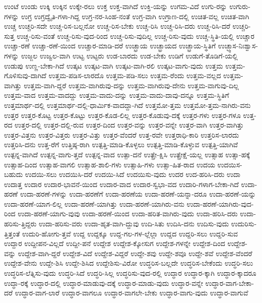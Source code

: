 {ಉಂಟೆ
ಉಂಡು
ಉಕ್ಕಿ
ಉಕ್ಕಿನ
ಉಕ್ಕೇ-ರಲು
ಉಕ್ತ
ಉಕ್ತ-ವಾಗಿದೆ
ಉಕ್ತಿ-ಯನ್ನು
ಉಗಮ-ವಿದೆ
ಉಗು-ರನ್ನು
ಉಗುರು-ಗಳನ್ನು
ಉಗ್ರ
ಉಗ್ರದ್ವೈತಿ-ಗಳಾ-ಗಿದ್ದ
ಉಗ್ರ-ನರ-ಸಿಂಹ-ನಂತೆ
ಉಗ್ರ-ವಾಗಿ
ಉಗ್ರಾಣ-ದಲ್ಲಿ
ಉಚಿತ-ವಲ್ಲ
ಉಚಿತ-ವಾಗಿ
ಉಚ್ಚ
ಉಚ್ಚರಿ-ಸದೇ
ಉಚ್ಚ-ರಿಸ-ಬಲ್ಲನೋ
ಉಚ್ಚ-ರಿಸ-ಬೇಕು
ಉಚ್ಚ-ರಿಸಿ
ಉಚ್ಚ-ರಿಸಿ-ದರು
ಉಚ್ಚ-ರಿಸಿ-ದರೆ
ಉಚ್ಚರಿ-ಸುತ್ತ
ಉಚ್ಚ-ರಿಸು-ವಂತೆ
ಉಚ್ಚ-ರಿಸು-ವುದ-ರಿಂದ
ಉಚ್ಚ-ರಿಸು-ವುದಿಲ್ಲ
ಉಚ್ಚ-ರಿಸು-ವುದು
ಉಚ್ಚ-ಸ್ಥಿತಿ-ಯಲ್ಲಿ
ಉಚ್ಚಾರ
ಉಚ್ಚಾ-ರಣೆ
ಉಚ್ಚಾ-ರಣೆ-ಯಿಂದ
ಉಚ್ಚಾರ-ಮಾಡಿ-ದರೆ
ಉಚ್ಛ್ರಾಯ
ಉಚ್ಛ್ರಾಯದ
ಉಚ್ಛ್ರಾಯ-ಸ್ಥಿತಿಗೆ
ಉಚ್ಛ್ವಾಸ-ನಿಃಶ್ವಾಸ-ಗಳನ್ನು
ಉಜ್ಜಲ
ಉಜ್ವಲ-ವಾಗಿ
ಉಟ್ಟ
ಉಟ್ಟರು
ಉಡ-ಬಾರದು
ಉಡ-ಬೇಕು
ಉಡಿಗೆ
ಉಡುಗೆ-ತೊಡಿಗೆ-ಯಲ್ಲಿ
ಉಡುಪು
ಉಣ್ಣ-ಬೇಕಾ-ಗಿದೆ
ಉತ್ಕಟ
ಉತ್ಕಟ-ವಾಗಿ
ಉತ್ಕಟ-ವಾಗಿ-ರಲಿ
ಉತ್ಕಟ-ವಾಗು-ವುದು
ಉತ್ತಮ
ಉತ್ತಮ-ಗೊಳಿಸುವು-ದಾಗಿದೆ
ಉತ್ತಮ-ಪಡಿಸ-ಲಾರದೊ
ಉತ್ತಮ-ಪಡಿ-ಸಲು
ಉತ್ತಮ-ರೆಂದು
ಉತ್ತಮ-ವಲ್ಲದ
ಉತ್ತಮ-ವಾಗಿತ್ತು
ಉತ್ತಮ-ವಾಗಿ-ದ್ದರೆ
ಉತ್ತಮ-ವಾಗಿರುವು-ದನ್ನು
ಉತ್ತಮ-ವಾಗಿರುವು-ದೇನು
ಉತ್ತಮ-ವಾಗುವು-ದಿಲ್ಲ
ಉತ್ತಮ-ವಾದ
ಉತ್ತಮ-ವಾದದ್ದು
ಉತ್ತಮ-ವಾದು-ದನ್ನು
ಉತ್ತಮ-ವಾದು-ದಾವು-ದನ್ನೂ
ಉತ್ತಮ-ಸ್ಥಿತಿಗೆ
ಉತ್ತಮಾರ್ಥ-ದಲ್ಲಿ
ಉತ್ತಮಾರ್ಥ-ದಲ್ಲಿ-ಧಾರ್ಮಿಕ-ವಾದದ್ದಾ-ಗಿದೆ
ಉತ್ತಮೋ-ತ್ತಮ
ಉತ್ತಮೋ-ತ್ತಮ-ನಾಗಿರು-ವನು
ಉತ್ತರ
ಉತ್ತರ-ಕೊಟ್ಟ
ಉತ್ತರ-ಕೊಟ್ಟು
ಉತ್ತರ-ಕೊಡ-ಲಿಲ್ಲ
ಉತ್ತರ-ಕೊಡುವು-ದಕ್ಕೆ
ಉತ್ತರ-ಗಳು
ಉತ್ತರ-ಗಳೂ
ಉತ್ತ-ರದ
ಉತ್ತರ-ದಲ್ಲಿ
ಉತ್ತರ-ದಲ್ಲಿ-ರುವ
ಉತ್ತರ-ದಿಂದ
ಉತ್ತರ-ವನ್ನು
ಉತ್ತರ-ವನ್ನೇ
ಉತ್ತರ-ವಾಗಿ
ಉತ್ತರ-ವಾಗಿತ್ತು
ಉತ್ತರ-ವಿತ್ತನು
ಉತ್ತರ-ವಿತ್ತರು
ಉತ್ತರ-ವಿತ್ತು
ಉತ್ತರ-ವೆಂದರೆ
ಉತ್ತ-ರವೇ
ಉತ್ತರಾಧಿ-ಕಾರಿ
ಉತ್ತರಿಸ-ಲಾರದು
ಉತ್ತರಿಸಿ-ದನು
ಉತ್ತ-ರೆಗೆ
ಉತ್ತಿಷ್ಠ-ರಾಗಿ
ಉತ್ಪತ್ತಿ-ಮಾಡಿ-ಕೊಳ್ಳಲು
ಉತ್ಪತ್ತಿ-ಮಾಡಿ-ಕೊಳ್ಳುವ
ಉತ್ಪತ್ತಿ-ಯಾಗಿವೆ
ಉತ್ಪನ್ನ-ವಾಗಿದೆ
ಉತ್ಪನ್ನ-ವಾಗು-ತ್ತದೆ
ಉತ್ಪನ್ನ-ವಾದ
ಉತ್ಪಾ-ದನೆ
ಉತ್ಪ್ರೇ-ಕ್ಷಿಸಿ
ಉತ್ಪ್ರೇಕ್ಷೆ-ಯಲ್ಲ
ಉತ್ಸಾಹ
ಉತ್ಸಾ-ಹಕ್ಕೆ
ಉತ್ಸಾಹ-ದಿಂದ
ಉತ್ಸಾಹ-ವಾಗಲಿ
ಉತ್ಸಾಹ-ಶಾಲಿ-ಗಳು
ಉತ್ಸಾಹಿ-ಗಳು
ಉತ್ಸಾ-ಹಿತ-ರಾದ
ಉದಯ
ಉದಯಿಸ-ಬಹುದು
ಉದಯಿ-ಸಲು
ಉದಯಿಸಿ-ದರೆ
ಉದಯಿ-ಸಿದೆ
ಉದಯಿಸು-ವುದು
ಉದರ
ಉದ-ಹರಿಸಿ-ದರು
ಉದಾ
ಉದಾತ್ತ
ಉದಾರ
ಉದಾರ-ಭಾವನೆ-ಯಿಂದ
ಉದಾರ-ವಾದ
ಉದಾರ-ಸ್ವಭಾ-ವದ
ಉದಾರಿ-ಗಳಾಗ-ಬೇಕಾ-ಗಿದೆ
ಉದಾ-ಹರಣೆ
ಉದಾ-ಹರಣೆ-ಗಳನ್ನು
ಉದಾ-ಹರಣೆಗೆ
ಉದಾ-ಹರಣೆಯ
ಉದಾ-ಹರಣೆ-ಯನ್ನಾ-ದರೂ
ಉದಾ-ಹರಣೆ-ಯನ್ನು
ಉದಾ-ಹರಣೆ-ಯಾಗ-ಲಿಲ್ಲ
ಉದಾ-ಹರಣೆ-ಯಾಗಿತ್ತು
ಉದಾ-ಹರಣೆ-ಯಾಗಿರು-ವನು
ಉದಾ-ಹರಣೆ-ಯಾಗಿರು-ವುದ-ರಿಂದ
ಉದಾ-ಹರಣೆ-ಯಾಗು-ವುವು
ಉದಾ-ಹರಣೆ-ಯಿಂದ
ಉದಾ-ಹರಿತ-ವಾಗಿರು-ವುದು
ಉದಾ-ಹರಿಸಿ-ದರು
ಉದಾ-ಹರಿಸು-ತ್ತಿದ್ದರು
ಉದಾ-ಹರಿಸು-ವರು
ಉದಾ-ಹೃತ-ವಾಗಿ-ದ್ದುವು
ಉದಿ-ಸಿತು
ಉದಿಸಿ-ದನು
ಉದಿಸು-ವುದು
ಉದುರಿಸು-ತ್ತಿತ್ತಂತೆ
ಉದುರಿ-ಹೋಗು-ತ್ತವೆ
ಉದ್ದ
ಉದ್ದಕ್ಕೂ
ಉದ್ದ-ಗಲ-ಗಳ-ಲ್ಲೆಲ್ಲಾ
ಉದ್ದದ
ಉದ್ದರಿ-ಸಲು
ಉದ್ದರಿ-ಸುವ
ಉದ್ದಾರ
ಉದ್ದೀಪನ-ವಿಲ್ಲದೆ
ಉದ್ದೀ-ಪನೆ
ಉದ್ದೇಶ
ಉದ್ದೇಶ-ಕ್ಕೋಸುಗ
ಉದ್ದೇಶ-ಗಳನ್ನೇ
ಉದ್ದೇಶ-ದಿಂದ
ಉದ್ದೇಶ-ವನ್ನು
ಉದ್ದೇಶ-ವಾಗಿ-ದ್ದರೆ
ಉದ್ದೇಶ-ವಿದೆ
ಉದ್ದೇಶ-ವಿದ್ದರೆ
ಉದ್ದೇ-ಶವು
ಉದ್ದೇ-ಶವೂ
ಉದ್ದೇ-ಶವೆ
ಉದ್ದೇಶ-ವೆಂದರೆ
ಉದ್ದೇಶ-ವೇನು
ಉದ್ದೇ-ಶಿಸಿ
ಉದ್ದೇ-ಶಿಸಿದ
ಉದ್ದೇಶಿಸು-ವಿರೋ
ಉದ್ಧರಿಸ-ಬಲ್ಲದೇ
ಉದ್ಧರಿಸ-ಬೇಕೆಂದು
ಉದ್ಧರಿ-ಸಲು
ಉದ್ಧರಿಸ-ಲೆತ್ನಿಸು-ವುದು
ಉದ್ಧರಿ-ಸಿದೆ
ಉದ್ಧರಿ-ಸಿಲ್ಲ
ಉದ್ಧರಿಸು-ವುದ-ರಲ್ಲಿ
ಉದ್ಧಾರ
ಉದ್ಧಾರ-ಕ್ಕಾಗಿ
ಉದ್ಧಾರ-ಕ್ಕಾದರೂ
ಉದ್ಧಾ-ರಕ್ಕೆ
ಉದ್ಧಾರ-ದಲ್ಲಿ
ಉದ್ಧಾರ-ಮಾಡುವು-ದಕ್ಕೆ
ಉದ್ಧಾರ-ಮಾಡು-ವುದು
ಉದ್ಧಾರ-ವನ್ನೇ
ಉದ್ಧಾರ-ವಾಗ-ಬೇಕಾ-ದರೆ
ಉದ್ಧಾರ-ವಾಗ-ಲಾರೆ
ಉದ್ಧಾರ-ವಾಗಲೂ
ಉದ್ಧಾರ-ವಾಗಲೇ-ಬೇಕು
ಉದ್ಧಾರ-ವಾಗು-ವುದು
ಉದ್ಧಾರ-ವಾಗುವೆ
}
